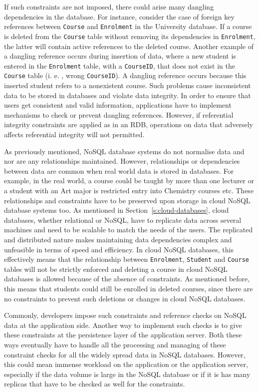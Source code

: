 If such constraints are not imposed,   there could arise many dangling
dependencies in the database.  For instance,   consider the case of foreign key
references between \texttt{Course} and \texttt{Enrolment} in the  University
database.  If a course is deleted from the \texttt{Course} table without
removing its dependencies in \texttt{Enrolment},   the latter will contain
active references to the deleted course.  Another example of a dangling
reference occurs during insertion of data,   where a new student is entered in
the \texttt{Enrolment} table,   with a \texttt{CourseID},   that does not exist
in the \texttt{Course} table (i. e. ,   wrong \texttt{CourseID}).  A dangling
reference occurs because this inserted student refers to a nonexistent course.
Such problems cause inconsistent data to be stored in databases and violate data
integrity.  In order to ensure that users get consistent and valid information,
applications  have to implement mechanisms to check or prevent dangling
references.  However, if referential integrity constraints are applied as in an
\ac{RDB},   operations on data that  adversely affects referential integrity  
will not permitted.

As previously mentioned,   \ac{NoSQL} database systems do not normalise data and
nor are any relationships maintained.  However, relationships or dependencies
between data are common when real world data is stored in databases.  For
example,   in the real world,   a course could be taught by more than one
lecturer or a student with an Art major is restricted entry into Chemistry
courses etc.  These relationships and constraints have to be preserved upon
storage in cloud \ac{NoSQL} database systems too.  As mentioned in
Section~\ref{s:cloud-databases},   cloud databases,   whether relational or
\ac{NoSQL},   have to replicate data across several machines and need to be
scalable to match the needs of the users.  The replicated and distributed nature
makes maintaining data dependencies complex and unfeasible in terms of speed and
efficiency.  In cloud \ac{NoSQL} databases,   this effectively means that the
relationship between \texttt{Enrolment}, \texttt{Student} and \texttt{Course}
tables will not be strictly enforced and deleting a course in cloud \ac{NoSQL}
databases is allowed because of the absence of constraints.  As mentioned
before,   this means that students could still be enrolled in deleted courses,  
since there are no constraints to prevent such deletions or changes in cloud
\ac{NoSQL} databases.

Commonly,   developers impose such constraints and reference checks on
\ac{NoSQL} data at the application side.  Another way to implement such checks
is to give these constraints at the persistence layer of the application server.
 Both these ways  eventually have to handle all the processing and managing
of these constraint checks for all the widely spread data in \ac{NoSQL}
databases. However,   this could mean immense workload on the application or the
application server,   especially if the data volume is large in the \ac{NoSQL}
database or if it is has many replicas that have to be checked as well for the
constraints.


